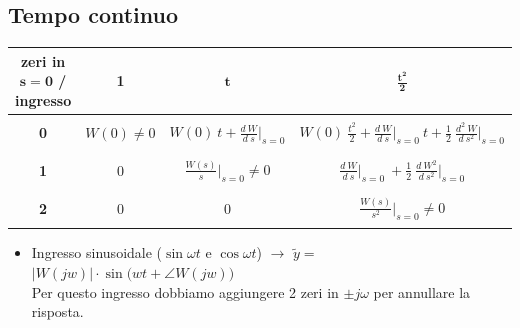 \documentclass{report}
\theoremstyle{nostyle}
\begin{document}
\subsection*{Tempo continuo}
\begin{center}
\begin{tabular}{c||c|c|c}
    
    \textbf{zeri in} $\bm{s=0}$ \textbf{/ ingresso} & \textbf{1} & $\displaystyle \bm{t} $ & $\displaystyle \bm{\frac{t^2}{2}}$\\
    \hline
    \hline
    & & & \\
    \textbf{0} & $\displaystyle W(0) \neq 0$ & $ \displaystyle W(0)\ t + \frac{d\ W}{d\ s}\bigg|_{s = 0} $ & $ \displaystyle W(0)\  \frac{t^2}{2} + \frac{d \ W}{d\ s}\bigg|_{s=0} \ t + \frac{1}{2}\ \frac{d^2 \ W}{d\ s^2}\bigg|_{s = 0 }$\\
    & & & \\
    \hline
    & & & \\
    \textbf{1} & 0 & $ \displaystyle \frac{W(s)}{s}\bigg|_{s = 0} \neq 0$ & $\displaystyle \frac{d \ W}{d \ s}\bigg|_{s = 0} \ + \frac{1}{2}\ \frac{d\ W^2}{d \ s^2}\bigg|_{s = 0}  $\\
    & & & \\
    \hline
    & & & \\
    \textbf{2} & 0 & 0 & $\displaystyle  \frac{W(s)}{s^2}\bigg|_{s = 0} \neq 0$ \\
    & & & \\
   
\end{tabular}
\begin{itemize}
    \item Ingresso sinusoidale ($\sin \omega t $ e $\cos\omega t$) $\rightarrow$ $\widetilde{y} = $ $\big|   W(j w)  \big| \cdot \sin\Big( wt  + \angle W(jw) \Big) $\smallskip\\
    Per questo ingresso dobbiamo aggiungere 2 zeri in $\pm j\omega $ per annullare la risposta.
    
\end{itemize}

\end{center}
\end{document}
